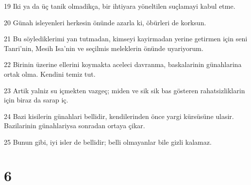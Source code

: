 \par 19 Iki ya da üç tanik olmadikça, bir ihtiyara yöneltilen suçlamayi kabul etme.
\par 20 Günah isleyenleri herkesin önünde azarla ki, öbürleri de korksun.
\par 21 Bu söylediklerimi yan tutmadan, kimseyi kayirmadan yerine getirmen için seni Tanri'nin, Mesih Isa'nin ve seçilmis meleklerin önünde uyariyorum.
\par 22 Birinin üzerine ellerini koymakta aceleci davranma, baskalarinin günahlarina ortak olma. Kendini temiz tut.
\par 23 Artik yalniz su içmekten vazgeç; miden ve sik sik bas gösteren rahatsizliklarin için biraz da sarap iç.
\par 24 Bazi kisilerin günahlari bellidir, kendilerinden önce yargi kürsüsüne ulasir. Bazilarinin günahlariysa sonradan ortaya çikar.
\par 25 Bunun gibi, iyi isler de bellidir; belli olmayanlar bile gizli kalamaz.

\chapter{6}

